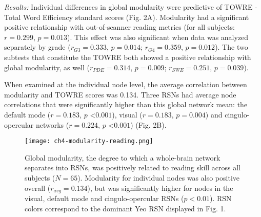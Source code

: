 \emph{Results:} Individual differences in global modularity were predictive of TOWRE - Total Word Efficiency standard scores (Fig. 2A). Modularity had a significant positive relationship with out-of-scanner reading metrics (for all subjects: $r = 0.299$, $p = 0.013$). This effect was also significant when data was analyzed separately by grade ($r_{G3} = 0.333$, $p = 0.014$; $r_{G4} = 0.359$, $p = 0.012$). The two subtests that constitute the TOWRE both showed a positive relationship with global modularity, as well ($r_{PDE} = 0.314$, $p = 0.009$; $r_{SWE} = 0.251$, $p = 0.039$). 

When examined at the individual node level, the average correlation between modularity and TOWRE scores was 0.134. Three RSNs had average node correlations that were significantly higher than this global network mean: the default mode ($r = 0.183$, $p$ \textless $0.001$), visual ($r = 0.183$, $p = 0.004$) and cingulo-opercular networks ($r = 0.224$, $p$ \textless $0.001$) (Fig. 2B). 


\begin{figure}[h!]
\centering
\texttt{[image: ch4-modularity-reading.png]}
\caption[Modularity metrics at rest predict reading skill.] {Global modularity, the degree to which a whole-brain network separates into RSNs, was positively related to reading skill across all subjects ($N = 65$). Modularity for individual nodes was also positive overall ($r_{avg} = 0.134$), but was significantly higher for nodes in the visual, default mode and cingulo-opercular RSNs ($p < 0.01$). RSN colors correspond to the dominant Yeo RSN displayed in Fig. 1.}
\label{fig:texlogo}
\end{figure}


